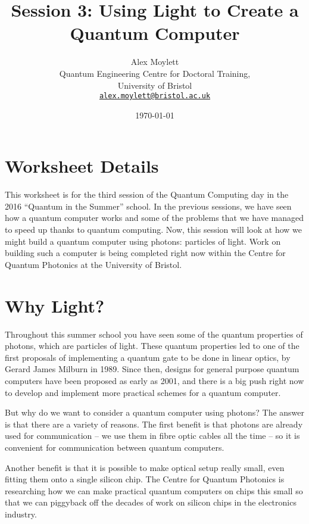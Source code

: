 \documentclass[twocolumn]{article}
\begin{document}
\lstset{style=Style1}

\title{Session 3: Using Light to Create a Quantum Computer}
\author{Alex Moylett\\
        	Quantum Engineering Centre for Doctoral Training,\\
		University of Bristol\\
		\texttt{\href{mailto:alex.moylett@bristol.ac.uk}{alex.moylett@bristol.ac.uk}}
		}
\date{\today}
\maketitle

\section*{Worksheet Details}

This worksheet is for the third session of the Quantum Computing day in the 2016 ``Quantum in the Summer'' school. In the previous sessions, we have seen how a quantum computer works and some of the problems that we have managed to speed up thanks to quantum computing. Now, this session will look at how we might build a quantum computer using photons: particles of light. Work on building such a computer is being completed right now within the Centre for Quantum Photonics at the University of Bristol.

\section{Why Light?}
\label{sec:why}

Throughout this summer school you have seen some of the quantum properties of photons, which are particles of light. These quantum properties led to one of the first proposals of implementing a quantum gate to be done in linear optics, by Gerard James Milburn in 1989. Since then, designs for general purpose quantum computers have been proposed as early as 2001, and there is a big push right now to develop and implement more practical schemes for a quantum computer.

But why do we want to consider a quantum computer using photons? The answer is that there are a variety of reasons. The first benefit is that photons are already used for communication -- we use them in fibre optic cables all the time -- so it is convenient for communication between quantum computers.

Another benefit is that it is possible to make optical setup really small, even fitting them onto a single silicon chip. The Centre for Quantum Photonics is researching how we can make practical quantum computers on chips this small so that we can piggyback off the decades of work on silicon chips in the electronics industry.
\end{document}
